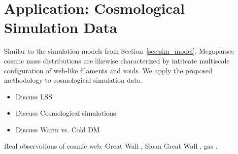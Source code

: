 \documentclass[12pt]{article}
\begin{document}
\section{Application: Cosmological Simulation Data}
\label{sec:application}

Similar to the simulation models from Section~\ref{sec:sim_model}, Megaparsec cosmic mass distributions are likewise characterized by intricate multiscale configuration of web-like filaments and voids. We apply the proposed methodology to cosmological simulation data.

{\color{red}
\begin{itemize}
\item  Discuss LSS
\item  Discuss Cosmological simulations
\item  Discuss Warm vs. Cold DM
\end{itemize}
Real observations of cosmic web:  Great Wall \citep{geller1989mapping}, Sloan Great Wall \citep{gott2005map}, gas \citep{cantalupo2014cosmic}.}
\end{document}
